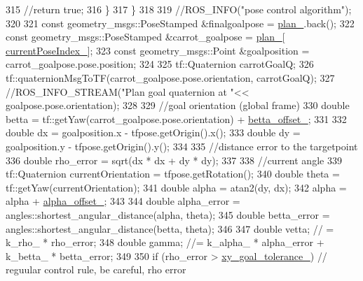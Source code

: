 \begin{DoxyCode}
{315             \textcolor{comment}{//return true;}
316         \}
317     \}
318 
319     \textcolor{comment}{//ROS\_INFO("pose control algorithm");}
320 
321     \textcolor{keyword}{const} geometry\_msgs::PoseStamped &finalgoalpose = \hyperlink{classcl__move__base__z_1_1forward__local__planner_1_1ForwardLocalPlanner_a929e5d0a9db3027810beb658a2343560}{plan\_}.back();
322     \textcolor{keyword}{const} geometry\_msgs::PoseStamped &carrot\_goalpose = \hyperlink{classcl__move__base__z_1_1forward__local__planner_1_1ForwardLocalPlanner_a929e5d0a9db3027810beb658a2343560}{plan\_}[
      \hyperlink{classcl__move__base__z_1_1forward__local__planner_1_1ForwardLocalPlanner_af4019077a7661d10957cca16222547c2}{currentPoseIndex\_}];
323     \textcolor{keyword}{const} geometry\_msgs::Point &goalposition = carrot\_goalpose.pose.position;
324 
325     tf::Quaternion carrotGoalQ;
326     tf::quaternionMsgToTF(carrot\_goalpose.pose.orientation, carrotGoalQ);
327     \textcolor{comment}{//ROS\_INFO\_STREAM("Plan goal quaternion at "<< goalpose.pose.orientation);}
328 
329     \textcolor{comment}{//goal orientation (global frame)}
330     \textcolor{keywordtype}{double} betta = tf::getYaw(carrot\_goalpose.pose.orientation) + \hyperlink{classcl__move__base__z_1_1forward__local__planner_1_1ForwardLocalPlanner_a935db3e785e3276d42b34d58011e793c}{betta\_offset\_};
331 
332     \textcolor{keywordtype}{double} dx = goalposition.x - tfpose.getOrigin().x();
333     \textcolor{keywordtype}{double} dy = goalposition.y - tfpose.getOrigin().y();
334 
335     \textcolor{comment}{//distance error to the targetpoint}
336     \textcolor{keywordtype}{double} rho\_error = sqrt(dx * dx + dy * dy);
337 
338     \textcolor{comment}{//current angle}
339     tf::Quaternion currentOrientation = tfpose.getRotation();
340     \textcolor{keywordtype}{double} theta = tf::getYaw(currentOrientation);
341     \textcolor{keywordtype}{double} alpha = atan2(dy, dx);
342     alpha = alpha + \hyperlink{classcl__move__base__z_1_1forward__local__planner_1_1ForwardLocalPlanner_a3d1b7e2ddf54efd67e4935875c7b6a67}{alpha\_offset\_};
343 
344     \textcolor{keywordtype}{double} alpha\_error = angles::shortest\_angular\_distance(alpha, theta);
345     \textcolor{keywordtype}{double} betta\_error = angles::shortest\_angular\_distance(betta, theta);
346 
347     \textcolor{keywordtype}{double} vetta; \textcolor{comment}{// = k\_rho\_ * rho\_error;}
348     \textcolor{keywordtype}{double} gamma; \textcolor{comment}{//= k\_alpha\_ * alpha\_error + k\_betta\_ * betta\_error;}
349 
350     \textcolor{keywordflow}{if} (rho\_error > \hyperlink{classcl__move__base__z_1_1forward__local__planner_1_1ForwardLocalPlanner_acd2ed91ee166f03faeeb9d6a4b91084b}{xy\_goal\_tolerance\_}) \textcolor{comment}{// reguular control rule, be careful, rho error
}}
\end{DoxyCode}
